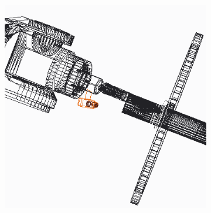 \begin{figure}
\begin{subfigure}[b]{0.3\textwidth}
\includegraphics[width=\textwidth]{graphics/CAD3}
\end{subfigure}
\caption{}
\end{figure}
